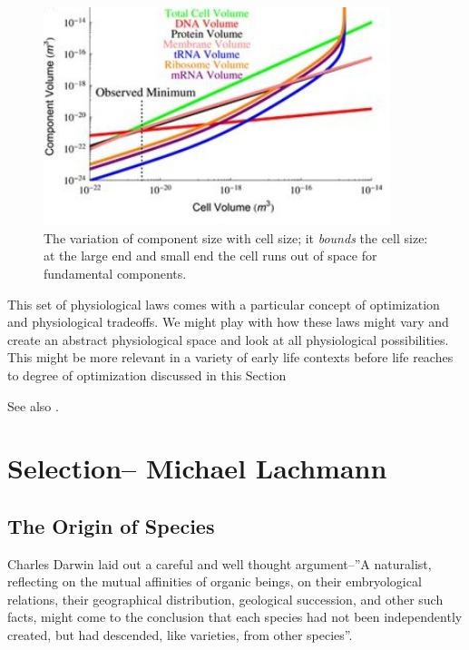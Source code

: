 \documentclass[]{article}
\begin{document}
\begin{figure}[H]
	\caption[The variation of component size with cell size]{The variation of component size with cell size; it \textit{bounds} the cell size: at the large end and small end the cell runs out of space for fundamental components.\cite{kempes2016evolutionary}}\label{fig:BacterialPhysiology}
	\includegraphics[width=0.9\textwidth]{BacterialPhysiology}
\end{figure}

This set of physiological laws comes with a particular concept of optimization and physiological tradeoffs. We might play with how these laws might vary and create an abstract physiological space and look at all physiological possibilities. This might be more relevant in a variety of early life contexts before life reaches to degree of optimization discussed in this Section


See also \cite{kempes2011predicting}.

\section{Selection-- Michael Lachmann}

\subsection{The Origin of Species}
Charles Darwin laid out a careful and well thought argument--''A naturalist, reflecting on the mutual affinities of organic beings, on their embryological relations, their geographical distribution, geological succession, and other such facts, might come to the conclusion that each species had not been independently created, but had descended, like varieties, from other  species''\cite{darwin1859origin}.
\end{document}
